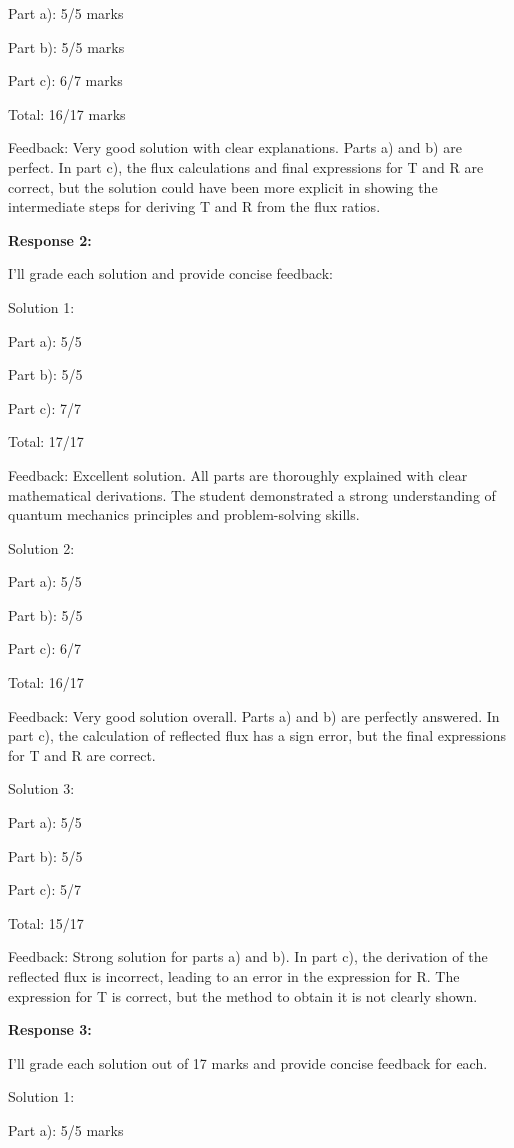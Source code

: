 \documentclass[a4paper,11pt]{article}
\begin{document}
Part a): 5/5 marks

Part b): 5/5 marks

Part c): 6/7 marks

Total: 16/17 marks

Feedback: Very good solution with clear explanations. Parts a) and b) are perfect. In part c), the flux calculations and final expressions for T and R are correct, but the solution could have been more explicit in showing the intermediate steps for deriving T and R from the flux ratios.

\bigskip
\textbf{Response 2:}

I'll grade each solution and provide concise feedback:

Solution 1:

Part a): 5/5

Part b): 5/5

Part c): 7/7

Total: 17/17

Feedback: Excellent solution. All parts are thoroughly explained with clear mathematical derivations. The student demonstrated a strong understanding of quantum mechanics principles and problem-solving skills.

Solution 2:

Part a): 5/5

Part b): 5/5

Part c): 6/7

Total: 16/17

Feedback: Very good solution overall. Parts a) and b) are perfectly answered. In part c), the calculation of reflected flux has a sign error, but the final expressions for T and R are correct.

Solution 3:

Part a): 5/5

Part b): 5/5

Part c): 5/7

Total: 15/17

Feedback: Strong solution for parts a) and b). In part c), the derivation of the reflected flux is incorrect, leading to an error in the expression for R. The expression for T is correct, but the method to obtain it is not clearly shown.

\bigskip
\textbf{Response 3:}

I'll grade each solution out of 17 marks and provide concise feedback for each.

Solution 1:

Part a): 5/5 marks
\end{document}
